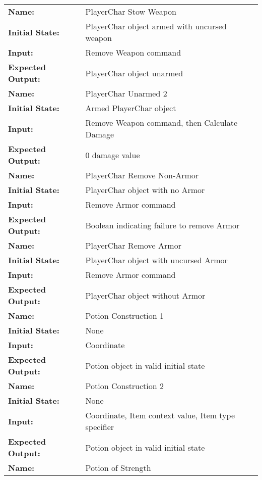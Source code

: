 \documentclass[12pt, titlepage]{article}
\begin{document}
\begin{center}
\begin{longtable}{ l | p{10cm} }
				\hline
				\rule{0pt}{1.5em}\textbf{Name:} & PlayerChar Stow Weapon\\
				\textbf{Initial State:} & PlayerChar object armed with uncursed weapon\\
				\textbf{Input:} & Remove Weapon command\\
				\textbf{Expected Output:} & PlayerChar object unarmed\\[0.6em]
				\hline
				\rule{0pt}{1.5em}\textbf{Name:} & PlayerChar Unarmed 2\\
				\textbf{Initial State:} & Armed PlayerChar object\\
				\textbf{Input:} & Remove Weapon command, then Calculate Damage\\
				\textbf{Expected Output:} & 0 damage value\\[0.6em]
				\hline
				\rule{0pt}{1.5em}\textbf{Name:} & PlayerChar Remove Non-Armor\\
				\textbf{Initial State:} & PlayerChar object with no Armor\\
				\textbf{Input:} & Remove Armor command\\
				\textbf{Expected Output:} & Boolean indicating failure to remove Armor\\[0.6em]
				\hline
				\rule{0pt}{1.5em}\textbf{Name:} & PlayerChar Remove Armor\\
				\textbf{Initial State:} & PlayerChar object with uncursed Armor\\
				\textbf{Input:} & Remove Armor command\\
				\textbf{Expected Output:} & PlayerChar object without Armor\\[0.6em]
				\hline
				\rule{0pt}{1.5em}\textbf{Name:} & Potion Construction 1\\
				\textbf{Initial State:} & None\\
				\textbf{Input:} & Coordinate\\
				\textbf{Expected Output:} & Potion object in valid initial state\\[0.6em]
				\hline
				\rule{0pt}{1.5em}\textbf{Name:} & Potion Construction 2\\
				\textbf{Initial State:} & None\\
				\textbf{Input:} & Coordinate, Item context value, Item type specifier\\
				\textbf{Expected Output:} & Potion object in valid initial state\\[0.6em]
				\hline
				\rule{0pt}{1.5em}\textbf{Name:} & Potion of Strength\\

\end{longtable}
\end{center}
\end{document}
